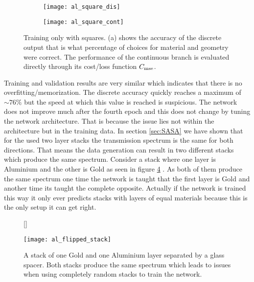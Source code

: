 \begin{figure}[H]
\centering
\captionsetup[subfigure]{position=b}
\begin{subfigure}{.5\textwidth}
    \centering
    \texttt{[image: al\_square\_dis]}
    \caption{}
    \label{}
\end{subfigure}%
\begin{subfigure}{.5\textwidth}
    \centering
    \texttt{[image: al\_square\_cont]}
    \caption{}
    \label{}
\end{subfigure}

\caption{Training only with squares. (a) shows the accuracy of the discrete output that is what percentage of choices for material and geometry were correct. The performance of the continuous branch is evaluated directly through its cost/loss function $C_{\mathrm{mse}}$.}
\label{fig:al:square_results}
\end{figure}


Training and validation results are very similar which indicates that there is no overfitting/memorization. The discrete accuracy quickly reaches a maximum of $\sim 76\%$ but the speed at which this value is reached is suspicious. The network does not improve much after the fourth epoch and this does not change by tuning the network architecture. That is because the issue lies not within the architecture but in the training data. In section \ref{sec:SASA} we have shown that for the used two layer stacks the transmission spectrum is the same for both directions. That means the data generation can result in two different stacks which produce the same spectrum. Consider a stack where one layer is Aluminium and the other is Gold as seen in figure \ref{fig:al:same_spec} . As both of them produce the same spectrum one time the network is taught that the first layer is Gold and another time its taught the complete opposite. Actually if the network is trained this way it only ever predicts stacks with layers of equal materials because this is the only setup it can get right.
\\

\begin{figure}[H]
    [\FBwidth]
    {\caption{A stack of one Gold and one Aluminium layer separated by a glass spacer. Both stacks produce the same spectrum which leads to issues when using completely random stacks to train the network.}
    \label{fig:al:same_spec}}
    {\texttt{[image: al\_flipped\_stack]}}
\end{figure}


